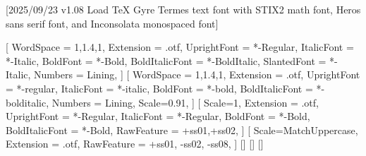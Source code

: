 
[2025/09/23 v1.08 Load TeX Gyre Termes text font with STIX2 math font, Heros sans serif font, and Inconsolata monospaced font]

%
%
\ifpdftex
	\RequirePackage[T1]{fontenc}	
	\RequirePackage{bm}
\else
    \RequirePackage[warnings-off={mathtools-colon,mathtools-overbracket},mathbf=sym]{unicode-math}
    \setmainfont{TeXGyreTermesX}[
		WordSpace = {1,1.4,1},%
    	Extension = .otf,
    	UprightFont = *-Regular,
    	ItalicFont = *-Italic,
    	BoldFont = *-Bold,
    	BoldItalicFont = *-BoldItalic,
		SlantedFont = *-Italic,
		Numbers = Lining,
	]
	\setsansfont{texgyreheros}[
		WordSpace = {1,1.4,1},
		Extension = .otf,
    	UprightFont = *-regular,
    	ItalicFont = *-italic,
    	BoldFont = *-bold,
    	BoldItalicFont = *-bolditalic,
		Numbers = Lining,
    	Scale=0.91,%
	]        
	\setmonofont{Inconsolatazi4}[
        Scale=1,%
        Extension = .otf,
        UprightFont = *-Regular,
        ItalicFont = *-Regular,%
        BoldFont = *-Bold, 
    	BoldItalicFont = *-Bold,%
        RawFeature = {+ss01,+ss02}, %
    ]             
	[%
    	Scale=MatchUppercase,
    	Extension = .otf,
    	RawFeature = {+ss01, -ss02, -ss08},
   ]
   \setmathfontface{}[]%
   \setmathfontface{}[]
   \setmathfontface{}[]%
   \newcommand*{\FRAC}[1]{{\addfontfeature{Fractions=On}#1}}%
\fi